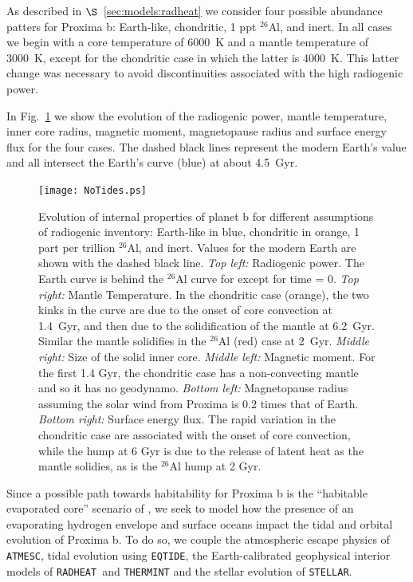 \documentclass[preprint,12pt]{aastex}
\def\atmesc{\texttt{\footnotesize{ATMESC}}\xspace}
\def\eqtide{\texttt{\footnotesize{EQTIDE}}\xspace}
\def\radheat{\texttt{\footnotesize{RADHEAT}}\xspace}
\def\thermint{\texttt{\footnotesize{THERMINT}}\xspace}
\def\stellar{\texttt{\footnotesize{STELLAR}}\xspace}
\begin{document}
As described in $\S$~\ref{sec:models:radheat} we consider four
possible abundance patters for Proxima b: Earth-like, chondritic, 1
ppt $^{26}$Al, and inert. In all cases we begin with a core
temperature of 6000~K and a mantle temperature of 3000~K, except for
the chondritic case in which the latter is 4000~K. This latter change
was necessary to avoid discontinuities associated with the high
radiogenic power.

In Fig.~\ref{fig:radiog} we show the evolution of the radiogenic
power, mantle temperature, inner core radius, magnetic moment,
magnetopause radius and surface energy flux for the four cases. The
dashed black lines represent the modern Earth's value and all
intersect the Earth's curve (blue) at about 4.5~Gyr.

\begin{figure} 
\begin{center}
\texttt{[image: NoTides.ps]}
\end{center}
\caption{Evolution of internal properties of planet b for different
  assumptions of radiogenic inventory: Earth-like in blue, chondritic
  in orange, 1 part per trillion $^{26}$Al, and inert. Values for the
  modern Earth are shown with the dashed black line. {\it Top left:}
  Radiogenic power. The Earth curve is behind the $^{26}$Al curve for
  except for time = 0. {\it Top right:} Mantle Temperature. In the
  chondritic case (orange), the two kinks in the curve are due to the
  onset of core convection at 1.4~Gyr, and then due to the
  solidification of the mantle at 6.2~Gyr. Similar the mantle
  solidifies in the $^{26}$Al (red) case at 2~Gyr. {\it Middle right:}
  Size of the solid inner core. {\it Middle left:} Magnetic
  moment. For the first 1.4 Gyr, the chondritic case has a
  non-convecting mantle and so it has no geodynamo. {\it Bottom left:}
  Magnetopause radius assuming the solar wind from Proxima is 0.2
  times that of Earth. {\it Bottom right:} Surface energy flux. The
  rapid variation in the chondritic case are associated with the onset
  of core convection, while the hump at 6 Gyr is due to the release of
  latent heat as the mantle solidies, as is the $^{26}$Al hump at 2
  Gyr.}
\label{fig:radiog}
\end{figure}

Since a possible path towards habitability for Proxima b is the ``habitable evaporated core'' scenario of \citet{Luger15},
we seek to model how the presence of an evaporating hydrogen envelope and surface oceans impact the tidal and
orbital evolution of Proxima b.  To do so, we couple the atmospheric escape physics of \atmesc, tidal evolution using \eqtide, the Earth-calibrated geophysical interior models of \radheat \ and \thermint and the stellar evolution of \stellar.
\end{document}

